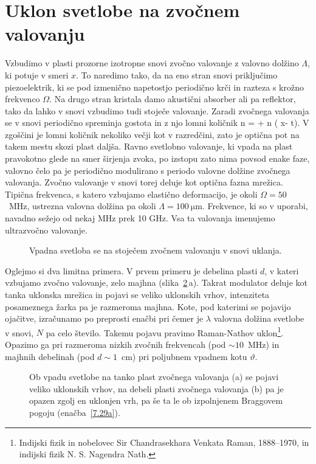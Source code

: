 \section{Uklon svetlobe na zvočnem valovanju}
Vzbudimo v plasti prozorne izotropne snovi zvočno valovanje z valovno dolžino $\Lambda$, 
ki potuje v smeri $x$. To naredimo tako, da na eno stran snovi priključimo piezoelektrik, 
ki se pod izmenično napetostjo periodično krči in razteza s krožno frekvenco $\Omega$.
Na drugo stran kristala damo akustični absorber ali pa reflektor, tako da lahko 
v snovi vzbudimo tudi stoječe valovanje. 
Zaradi zvočnega valovanja se v snovi periodično spreminja gostota in 
z njo lomni količnik
\beq
n =  + \delta n \sin \left(\frac{2\pi}{\Lambda} x- \Omega t\right).
\eeq
V zgoščini je lomni količnik nekoliko večji kot v razredčini, zato je optična pot na takem mestu
skozi plast daljša. Ravno svetlobno valovanje, ki vpada na plast pravokotno glede
na smer širjenja zvoka, po izstopu zato nima povsod enake faze, 
valovno čelo pa je periodično modulirano s periodo 
valovne dolžine zvočnega valovanja. Zvočno valovanje v snovi torej deluje kot 
optična fazna mrežica. Tipična frekvenca, s katero vzbujamo elastično
deformacijo, je okoli $\Omega=50$~MHz, ustrezna valovna dolžina pa okoli $\Lambda = 100~\si{\micro\metre}$. 
Frekvence, ki so v uporabi, navadno sežejo od nekaj MHz prek 10 GHz. Vsa ta valovanja imenujemo
ultrazvočno valovanje. 

\begin{figure}[h]
\centering
\def\svgwidth{60truemm} 

\caption{Vpadna svetloba se na stoječem zvočnem valovanju v snovi uklanja.}
\label{fig:ao}
\end{figure}

Oglejmo si dva limitna primera. V prvem primeru je debelina plasti $d$, 
v kateri vzbujamo zvočno valovanje, zelo majhna (slika~\ref{fig:ao_bragg}\,a). 
Takrat modulator deluje kot tanka uklonska mrežica in pojavi se veliko 
uklonskih vrhov, intenziteta posameznega žarka pa je razmeroma majhna. 
Kote, pod katerimi se pojavijo ojačitve, izračunamo po preprosti enačbi
pri čemer je $\lambda$ valovna dolžina svetlobe v snovi, $N$ pa celo število. Takemu pojavu 
pravimo Raman-Nathov uklon\footnote{Indijski fizik in nobelovec Sir Chandrasekhara 
Venkata Raman, 1888--1970, 
in indijski fizik N. S. Nagendra Nath.}. 
Opazimo ga pri razmeroma nizkih zvočnih frekvencah 
(pod $\sim10$~MHz) in majhnih debelinah (pod $d\sim 1$~cm) pri poljubnem vpadnem 
kotu $\vartheta$.
\begin{figure}[h]
\centering
\def\svgwidth{120truemm} 

\caption{Ob vpadu svetlobe na tanko plast zvočnega valovanja (a) se pojavi veliko uklonskih vrhov, 
na debeli plasti zvočnega valovanja (b) pa je opazen zgolj en uklonjen vrh, 
pa še ta le ob izpolnjenem Braggovem pogoju (enačba~\ref{7.29a}).}
\label{fig:ao_bragg}
\end{figure}

